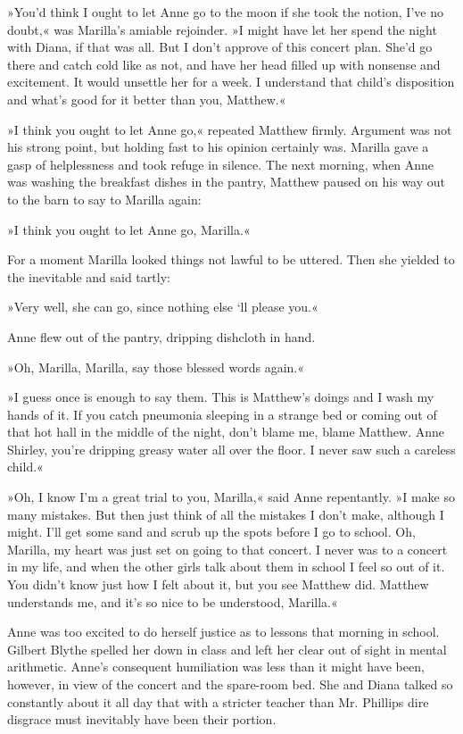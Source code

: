 »You'd think I ought to let Anne go to the moon if she took the notion, I've no doubt,« was Marilla's amiable rejoinder. »I might have let her spend the night with Diana, if that was all. But I don't approve of this concert plan. She'd go there and catch cold like as not, and have her head filled up with nonsense and excitement. It would unsettle her for a week. I understand that child's disposition and what's good for it better than you, Matthew.«

»I think you ought to let Anne go,« repeated Matthew firmly. Argument was not his strong point, but holding fast to his opinion certainly was. Marilla gave a gasp of helplessness and took refuge in silence. The next morning, when Anne was washing the breakfast dishes in the pantry, Matthew paused on his way out to the barn to say to Marilla again:

»I think you ought to let Anne go, Marilla.«

For a moment Marilla looked things not lawful to be uttered. Then she yielded to the inevitable and said tartly:

»Very well, she can go, since nothing else ‘ll please you.«

Anne flew out of the pantry, dripping dishcloth in hand.

»Oh, Marilla, Marilla, say those blessed words again.«

»I guess once is enough to say them. This is Matthew's doings and I wash my hands of it. If you catch pneumonia sleeping in a strange bed or coming out of that hot hall in the middle of the night, don't blame me, blame Matthew. Anne Shirley, you're dripping greasy water all over the floor. I never saw such a careless child.«

»Oh, I know I'm a great trial to you, Marilla,« said Anne repentantly. »I make so many mistakes. But then just think of all the mistakes I don't make, although I might. I'll get some sand and scrub up the spots before I go to school. Oh, Marilla, my heart was just set on going to that concert. I never was to a concert in my life, and when the other girls talk about them in school I feel so out of it. You didn't know just how I felt about it, but you see Matthew did. Matthew understands me, and it's so nice to be understood, Marilla.«

Anne was too excited to do herself justice as to lessons that morning in school. Gilbert Blythe spelled her down in class and left her clear out of sight in mental arithmetic. Anne's consequent humiliation was less than it might have been, however, in view of the concert and the spare-room bed. She and Diana talked so constantly about it all day that with a stricter teacher than Mr. Phillips dire disgrace must inevitably have been their portion.

